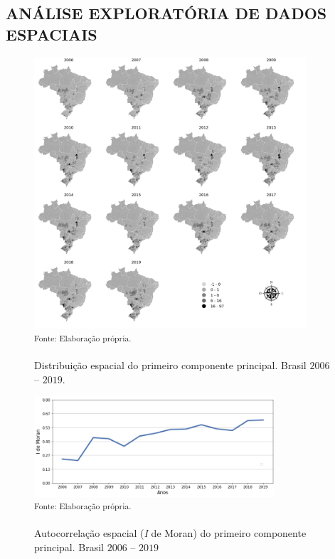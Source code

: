 \subsection{ANÁLISE EXPLORATÓRIA DE DADOS ESPACIAIS}


\begin{figure}[H]
	\centering
	\caption{Distribuição espacial do primeiro componente principal. Brasil $2006$ -- $2019$.}
	\includegraphics[width=0.9\textwidth]{figuras/map_CP1.png}\\
	\small \textsuperscript {Fonte: Elaboração própria.}
    \label{map_cp1}
\end{figure}

\begin{figure}[H]
	\centering
	\caption{Autocorrelação espacial (\textit{I} de Moran) do primeiro componente principal. Brasil $2006$ -- $2019$}
	\includegraphics[width=0.8\textwidth]{figuras/i_de_moran_cp1.png}\\
	\small \textsuperscript {Fonte: Elaboração própria.}
    \label{i_moran_cp1}
\end{figure}


